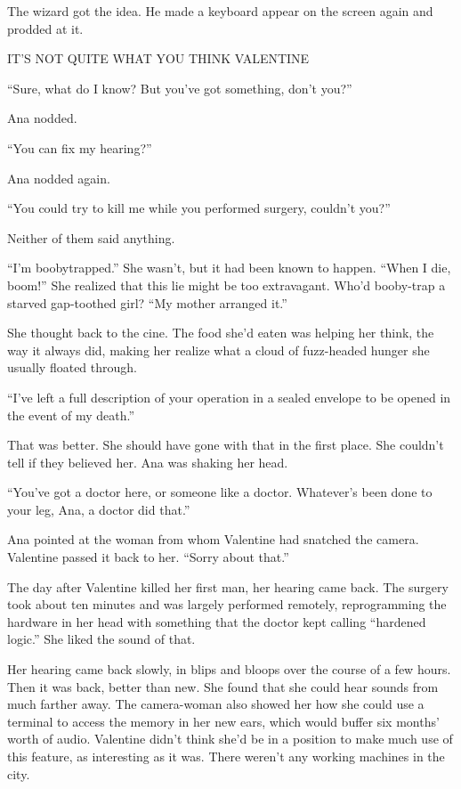 The wizard got the idea. He made a keyboard appear on the screen
again and prodded at it.

IT’S NOT QUITE WHAT YOU THINK VALENTINE

“Sure, what do I know? But you’ve got something, don’t you?”

Ana nodded.

“You can fix my hearing?”

Ana nodded again.

“You could try to kill me while you performed surgery, couldn’t
you?”

Neither of them said anything.

“I’m boobytrapped.” She wasn’t, but it had been known to happen.
“When I die, boom!” She realized that this lie might be too
extravagant. Who’d booby-trap a starved gap-toothed girl? “My
mother arranged it.”

She thought back to the cine. The food she’d eaten was helping her
think, the way it always did, making her realize what a cloud of
fuzz-headed hunger she usually floated through.

“I’ve left a full description of your operation in a sealed
envelope to be opened in the event of my death.”

That was better. She should have gone with that in the first place.
She couldn’t tell if they believed her. Ana was shaking her head.

“You’ve got a doctor here, or someone like a doctor. Whatever’s
been done to your leg, Ana, a doctor did that.”

Ana pointed at the woman from whom Valentine had snatched the
camera. Valentine passed it back to her. “Sorry about that.”

\tb

The day after Valentine killed her first man, her hearing came
back. The surgery took about ten minutes and was largely performed
remotely, reprogramming the hardware in her head with something
that the doctor kept calling “hardened logic.” She liked the sound
of that.

Her hearing came back slowly, in blips and bloops over the course
of a few hours. Then it was back, better than new. She found that
she could hear sounds from much farther away. The camera-woman also
showed her how she could use a terminal to access the memory in her
new ears, which would buffer six months’ worth of audio. Valentine
didn’t think she’d be in a position to make much use of this
feature, as interesting as it was. There weren’t any working
machines in the city.

